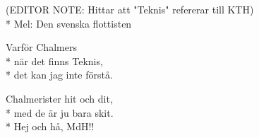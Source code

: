 \begin{SongText}
    \begin{SongInfo}
        (EDITOR NOTE: Hittar att "Teknis" refererar till KTH)\\*%
        Mel: Den svenska flottisten
    \end{SongInfo}
    \begin{SongVerse}
        Varför Chalmers\\*%
        när det finns Teknis,\\*%
        det kan jag inte förstå.
    \end{SongVerse}
    \begin{SongVerse}
        Chalmerister hit och dit,\\*%
        med de är ju bara skit.\\*%
        Hej och hå, MdH!!
    \end{SongVerse}
\end{SongText}
